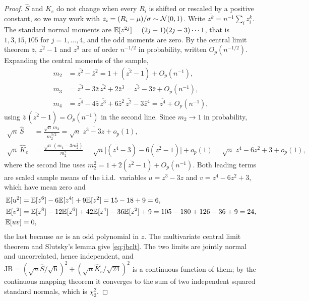 \begin{chapterrefs}
\begin{proof}
$\hat S$ and $\hat K_e$ do not change when every $R_i$ is shifted or rescaled by a positive constant, so we
may work with $z_i=(R_i-\mu)/\sigma\sim\mathcal{N}(0,1)$. Write $\overline{z^k}=n^{-1}\sum_i z_i^k$. The standard
normal moments are $\mathbb{E}[z^{2j}]=(2j-1)(2j-3)\cdots 1$, that is $1,3,15,105$ for $j=1,\dots,4$, and the odd
moments are zero. By the central limit theorem $\bar z$, $\overline{z^2}-1$ and $\overline{z^3}$ are of order
$n^{-1/2}$ in probability, written $O_p(n^{-1/2})$. Expanding the central moments of the sample,
\begin{align*}
  m_2 &= \overline{z^2}-\bar z^2 = 1 + (\overline{z^2}-1) + O_p(n^{-1}),\\
  m_3 &= \overline{z^3} - 3\bar z\,\overline{z^2} + 2\bar z^3 = \overline{z^3} - 3\bar z + O_p(n^{-1}),\\
  m_4 &= \overline{z^4} - 4\bar z\,\overline{z^3} + 6\bar z^2\,\overline{z^2} - 3\bar z^4 = \overline{z^4} + O_p(n^{-1}),
\end{align*}
using $\bar z\,(\overline{z^2}-1)=O_p(n^{-1})$ in the second line. Since $m_2\to 1$ in probability,
\begin{align*}
  \sqrt n\,\hat S &= \frac{\sqrt n\, m_3}{m_2^{3/2}} = \sqrt n\;\overline{z^3-3z} + o_p(1),\\
  \sqrt n\,\hat K_e &= \frac{\sqrt n\,(m_4-3m_2^2)}{m_2^2}
   = \sqrt n\bigl[(\overline{z^4}-3) - 6(\overline{z^2}-1)\bigr] + o_p(1)
   = \sqrt n\;\overline{z^4-6z^2+3} + o_p(1),
\end{align*}
where the second line uses $m_2^2 = 1 + 2(\overline{z^2}-1) + O_p(n^{-1})$. Both leading terms are scaled
sample means of the i.i.d.\ variables $u=z^3-3z$ and $v=z^4-6z^2+3$, which have mean zero and
\begin{align*}
  \mathbb{E}[u^2] &= \mathbb{E}[z^6]-6\mathbb{E}[z^4]+9\mathbb{E}[z^2] = 15-18+9 = 6,\\
  \mathbb{E}[v^2] &= \mathbb{E}[z^8]-12\mathbb{E}[z^6]+42\mathbb{E}[z^4]-36\mathbb{E}[z^2]+9 = 105-180+126-36+9 = 24,\\
  \mathbb{E}[uv]  &= 0,
\end{align*}
the last because $uv$ is an odd polynomial in $z$. The multivariate central limit theorem and Slutsky's
lemma give \cref{eq:jbclt}. The two limits are jointly normal and uncorrelated, hence independent, and
$\mathrm{JB} = (\sqrt n\hat S/\sqrt6)^2 + (\sqrt n\hat K_e/\sqrt{24})^2$ is a continuous function of them;
by the continuous mapping theorem it converges to the sum of two independent squared standard normals,
which is $\chi^2_2$.
\end{proof}


\end{chapterrefs}
